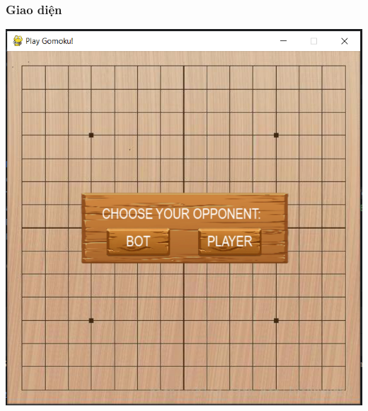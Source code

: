 \documentclass[a4paper]{article}
\begin{document}
    \subsubsection{Giao diện}
    \includegraphics{images/ChoseGameModeGomuku.png}
\end{document}
